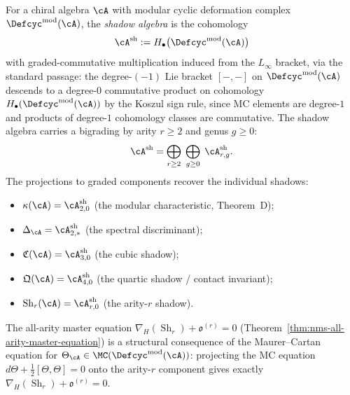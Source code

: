 \begin{definition}
\label{def:shadow-algebra}
\ClaimStatusProvedHere
{}
For a chiral algebra $\cA$ with modular cyclic deformation complex
$\Defcyc^{\mathrm{mod}}(\cA)$, the \emph{shadow algebra} is the
cohomology
\begin{equation}
\label{eq:shadow-algebra}
\cA^{\mathrm{sh}}
:=
H_\bullet\bigl(\Defcyc^{\mathrm{mod}}(\cA)\bigr)
\end{equation}
with graded-commutative multiplication induced from the $L_\infty$
bracket, via the standard passage: the degree-$(-1)$ Lie bracket $[-,-]$ on $\Defcyc^{\mathrm{mod}}(\cA)$ descends to a degree-$0$ commutative product on cohomology $H_\bullet(\Defcyc^{\mathrm{mod}}(\cA))$ by the Koszul sign rule, since MC elements are degree-$1$ and products of degree-$1$ cohomology classes are commutative.  The shadow algebra carries a bigrading by arity
$r \geq 2$ and genus $g \geq 0$:
\begin{equation}
\label{eq:shadow-algebra-bigrading}
\cA^{\mathrm{sh}}
=
\bigoplus_{r \geq 2}\;\bigoplus_{g \geq 0}\;
\cA^{\mathrm{sh}}_{r,g}.
\end{equation}
The projections to graded components recover the individual shadows:
\begin{itemize}
\item $\kappa(\cA) = \cA^{\mathrm{sh}}_{2,0}$
  \quad(the modular characteristic, Theorem~D);
\item $\Delta_{\cA} = \cA^{\mathrm{sh}}_{2,*}$
  \quad(the spectral discriminant);
\item $\mathfrak{C}(\cA) = \cA^{\mathrm{sh}}_{3,0}$
  \quad(the cubic shadow);
\item $\mathfrak{Q}(\cA) = \cA^{\mathrm{sh}}_{4,0}$
  \quad(the quartic shadow / contact invariant);
\item $\operatorname{Sh}_r(\cA) = \cA^{\mathrm{sh}}_{r,0}$
  \quad(the arity-$r$ shadow).
\end{itemize}
\end{definition}

\begin{proposition}
\label{prop:master-equation-from-mc}
\ClaimStatusProvedHere
{}
The all-arity master equation
$\nabla_H(\operatorname{Sh}_r) + \mathfrak{o}^{(r)} = 0$
(Theorem~\ref{thm:nms-all-arity-master-equation}) is a structural
consequence of the Maurer--Cartan equation for
$\Theta_{\cA} \in \MC(\Defcyc^{\mathrm{mod}}(\cA))$: projecting
the MC equation $d\Theta + \tfrac{1}{2}[\Theta,\Theta] = 0$ onto
the arity-$r$ component gives exactly
$\nabla_H(\operatorname{Sh}_r) + \mathfrak{o}^{(r)} = 0$.
\end{proposition}

